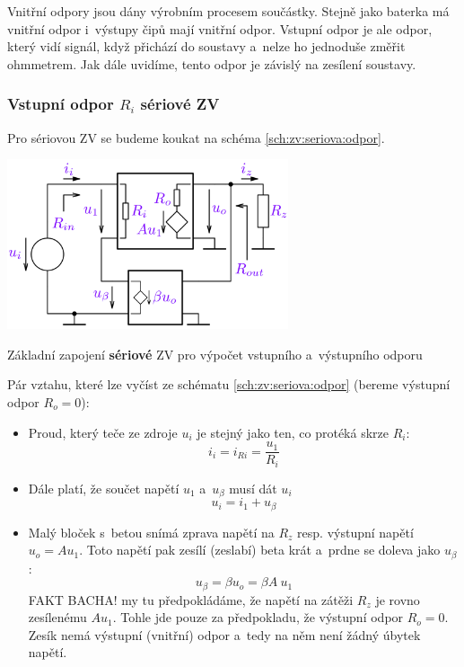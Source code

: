 \documentclass[a4paper,12pt]{article}   %
\begin{document}
Vnitřní odpory jsou dány výrobním procesem součástky. Stejně jako baterka má vnitřní odpor i~výstupy čipů mají vnitřní odpor. Vstupní odpor je ale odpor, který vidí signál, když přichází do soustavy a~nelze ho jednoduše změřit ohmmetrem. Jak dále uvidíme, tento odpor je závislý na zesílení soustavy.

\subsubsection*{Vstupní odpor $R_i$ sériové ZV}
Pro sériovou ZV se budeme koukat na schéma \ref{sch:zv:seriova:odpor}.
\begin{schema}[h!]
    \centering
    \includegraphics[height=5cm]{ZV_seriova-odpory.PNG}
    \caption{Základní zapojení \textbf{sériové} ZV pro výpočet vstupního a~výstupního odporu}
    \label{sch:zv:seriova:odpor}
\end{schema}

Pár vztahu, které lze vyčíst ze schématu \ref{sch:zv:seriova:odpor} (bereme výstupní odpor $R_o = 0$):
\begin{itemize}
    \item Proud, který teče ze zdroje $u_i$ je stejný jako ten, co protéká skrze $R_i$:
    \begin{equation}
        i_i = i_{Ri} = \frac{u_\text{1}}{R_i}
        \label{eq:ri}
    \end{equation}
    \item Dále platí, že součet napětí $u_\text{1}$ a~$u_\beta$ musí dát $u_i$
    \begin{equation}
        u_i = i_\text{1} + u_\beta
        \label{eq:soucet:napeti}
    \end{equation}
    \item Malý bloček s~betou snímá zprava napětí na $R_z$ resp. výstupní napětí $u_o = Au_\text{1}$. Toto napětí pak zesílí (zeslabí) beta krát a~prdne se doleva jako $u_\beta$:
    \begin{equation}
        u_\beta = \beta u_o = \beta A~u_\text{1}
        \label{eq:beta:napeti}
    \end{equation}
    FAKT BACHA! my tu předpokládáme, že napětí na zátěži $R_z$ je rovno zesílenému $Au_\text{1}$. Tohle jde pouze za předpokladu, že výstupní odpor $R_o = 0$. Zesík nemá výstupní (vnitřní) odpor a~tedy na něm není žádný úbytek napětí.
\end{itemize}
\end{document}
